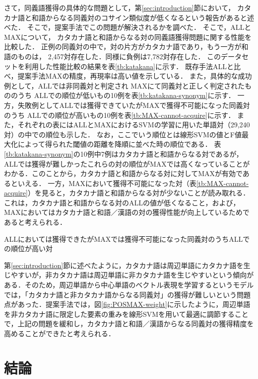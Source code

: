 \documentclass[japanese]{jnlp_1.4}
\begin{document}
さて，同義語獲得の具体的な問題として，第\ref{sec:introduction}節において，
カタカナ語と和語からなる同義対のコサイン類似度が低くなるという報告があると述べた．
そこで，提案手法でこの問題が解決されるかを調べた．
そこで，ALLとMAXについて，
カタカナ語と和語からなる対の同義語獲得問題に関する性能を比較した．
正例の同義対の中で，対の片方がカタカナ語であり，もう一方が和語のものは，
2,457対存在した．同様に負例は7,782対存在した．
このデータセットを利用した性能比較の結果を表\ref{tb:katakana}に示す．
既存手法ALLと比べ，提案手法MAXの精度，再現率は高い値を示している．
また，具体的な成功例として，ALLでは非同義対と判定され
MAXにて同義対と正しく判定されたもののうち
ALLでの順位が低いもの10例を表\ref{tb:katakana-synonym}に示す．
一方，失敗例としてALLでは獲得できていたがMAXで獲得不可能になった同義対のうち
ALLでの順位が高いもの10例を表\ref{tb:MAX-cannot-acquire}に示す．
また，それぞれの表にはALLとMAXにおけるSVMの学習に用いた単語対（29,240対）の中での順位も示した．
なお，ここでいう順位とは線形SVMの値とF値最大化によって得られた閾値の距離を降順に並べた時の順位である．
表\ref{tb:katakana-synonym}の10例中7例はカタカナ語と和語からなる対であるが，ALLでは獲得が難しかったこれらの対の順位がMAXでは高くなっていることがわかる．このことから，カタカナ語と和語からなる対に対してMAXが有効であるといえる．
一方，MAXにおいて獲得不可能になった対（表\ref{tb:MAX-cannot-acquire}）を見ると，カタカナ語と和語からなる対が少ないことが読み取れる．これは，カタカナ語と和語からなる対のALLの値が低くなること，および，MAXにおいてはカタカナ語と和語／漢語の対の獲得性能が向上しているためであると考えられる．

\begin{table}[t]
\caption{ALLにおいては獲得できたがMAXでは獲得不可能になった同義対のうちALLでの順位が高い対}
\label{tb:MAX-cannot-acquire}

\end{table}

第\ref{sec:introduction}節に述べたように，カタカナ語は周辺単語にカタカナ語を生じやすいが，非カタカナ語は周辺単語に非カタカナ語を生じやすいという傾向がある．そのため，周辺単語から中心単語のベクトル表現を学習するというモデルでは，「カタカナ語と非カタカナ語からなる同義対」の獲得が難しいという問題点があった．提案手法では，図\ref{fig:POSMAX-weight}に示したように，周辺単語を非カタカナ語に限定した要素の重みを線形SVMを用いて最適に調節することで，上記の問題を緩和し，カタカナ語と和語／漢語からなる同義対の獲得精度を高めることができたと考えられる．


\section{結論}
\label{sec:conclusion}
\end{document}
